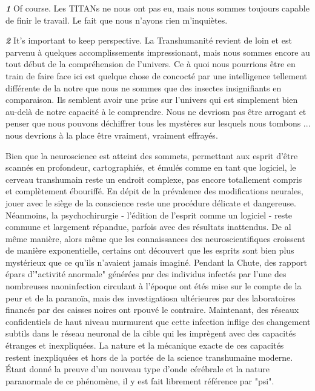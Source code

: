 \textbf{\textit{1}} Of course. Les TITANs ne nous ont pas eu, mais nous sommes toujours capable de finir le travail. Le fait que nous n'ayons rien m'inquiètes. 

\textbf{\textit{2}} It’s important to keep perspective. La Transhumanité revient de loin et est parvenu à quelques accomplissements impressionant, mais nous sommes encore au tout début de la compréhension de l'univers. Ce à quoi nous pourrions être en train de faire face ici est quelque chose de concocté par une intelligence tellement différente de la notre que nous ne sommes que des insectes insignifiants en comparaison. Ils semblent avoir une prise sur l'univers qui est simplement bien au-delà de notre capacité à le comprendre. Nous ne devriosn pas être arrogant et penser que nous pouvons déchiffrer tous les mystères sur lesquels nous tombons ... nous devrions à la place être vraiment, vraiment effrayés. 

\newpage



Bien que la neuroscience est atteint des sommets, permettant aux esprit d'être scannés en profondeur, cartographiés, et émulés comme en tant que logiciel, le cerveau transhumain reste un endroit complexe, pas encore totallement compris et complètement ébouriffé. En dépit de la prévalence des modifications neurales, jouer avec le siège de la conscience reste une procédure délicate et dangereuse. Néanmoins, la psychochirurgie - l'édition de l'esprit comme un logiciel - reste commune et largement répandue, parfois avec des résultats inattendus. De al même manière, alors même que les connaissances des neuroscientifiques croissent de manière exponentielle, certains ont découvert que les esprits sont bien plus mystérieux que ce qu'ils n'avaient jamais imaginé. Pendant la Chute, des rapport épars d'"activité anormale" générées par des individus infectés par l'une des nombreuses naoninfection circulant à l'époque ont étés mise sur le compte de la peur et de la paranoïa, mais des investigatiosn ultérieures par des laboratoires financés par des caisses noires ont rpouvé le contraire. Maintenant, des réseaux confidentiels de haut niveau murmurent que cette infection inflige des changement subtils dans le réseau neuronal de la cible qui les imprègent avec des capacités étranges et inexpliquées. La nature et la mécanique exacte de ces capacités restent inexpliquées et hors de la portée de la science transhumaine moderne. Étant donné la preuve d'un nouveau type d'onde cérébrale et la nature paranormale de ce phénomène, il y est fait librement référence par "psi". 

